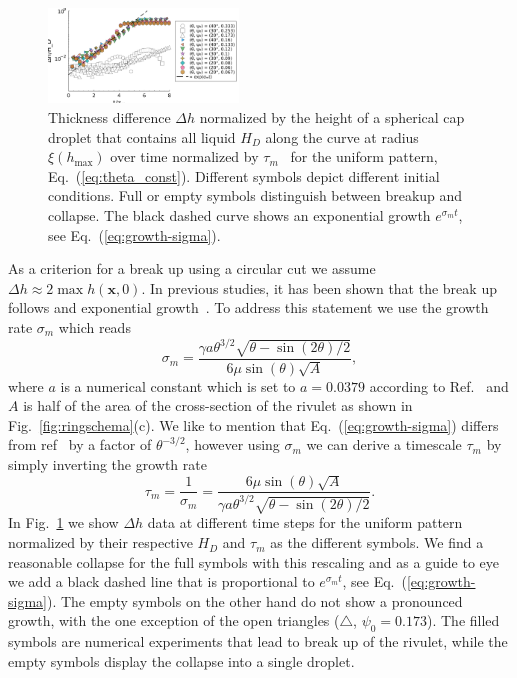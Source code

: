 \documentclass[twoside,twocolumn,9pt]{article}
\begin{document}
\begin{figure}
    \centering
    \includegraphics[width=0.45\textwidth]{assets/growth-breakup.pdf}
    \caption{Thickness difference $\Delta h$ normalized by the height of a spherical cap droplet that contains all liquid $H_D$ along the curve at radius $\xi(h_{\max})$ over time normalized by $\tau_{m}$~\cite{wuBreakupPatternedNanoscale2010} for the uniform pattern, Eq.~(\ref{eq:theta_const}). 
    Different symbols depict different initial conditions. 
    Full or empty symbols distinguish between breakup and collapse. 
    The black dashed curve shows an exponential growth $e^{\sigma_m t}$, see Eq.~(\ref{eq:growth-sigma}).
    }
    \label{fig:first_growth}
\end{figure}
As a criterion for a break up using a circular cut we assume $\Delta h \approx 2\max{h(\mathbf{x},0)}$. 
In previous studies, it has been shown that the break up follows and exponential growth~\cite{wuBreakupPatternedNanoscale2010, gonzalezStabilityLiquidRing2013, nguyenCompetitionCollapseBreakup2012}.
To address this statement we use the growth rate $\sigma_m$ which reads
\begin{equation}\label{eq:growth-sigma}
    \sigma_m = \frac{\gamma a \theta^{3/2}\sqrt{\theta - \sin(2\theta)/2}}{6\mu\sin(\theta)\sqrt{A}}, 
\end{equation}
where $a$ is a numerical constant which is set to $a = 0.0379$ according to Ref.~\cite{wuBreakupPatternedNanoscale2010, diezBreakupFluidRivulets2009} and $A$ is half of the area of the cross-section of the rivulet as shown in Fig.~\ref{fig:ringschema}(c).
We like to mention that Eq.~(\ref{eq:growth-sigma}) differs from ref~\cite{wuBreakupPatternedNanoscale2010} by a factor of $\theta^{-3/2}$, however using $\sigma_m$ we can derive a timescale $\tau_m$ by simply inverting the growth rate  
\begin{equation}\label{eq:tau_m}
    \tau_{m} = \frac{1}{\sigma_m} = \frac{6\mu\sin(\theta)\sqrt{A}}{\gamma a \theta^{3/2}\sqrt{\theta - \sin(2\theta)/2}}.      
\end{equation}
In Fig.~\ref{fig:first_growth} we show $\Delta h$ data at different time steps for the uniform pattern normalized by their respective $H_D$ and $\tau_m$ as the different symbols.  
We find a reasonable collapse for the full symbols with this rescaling and as a guide to eye we add a black dashed line that is proportional to $e^{\sigma_m t}$, see Eq.~(\ref{eq:growth-sigma}). 
The empty symbols on the other hand do not show a pronounced growth, with the one exception of the open triangles ($\triangle$, $\psi_0 = 0.173$). 
The filled symbols are numerical experiments that lead to break up of the rivulet, while the empty symbols display the collapse into a single droplet.
\end{document}

